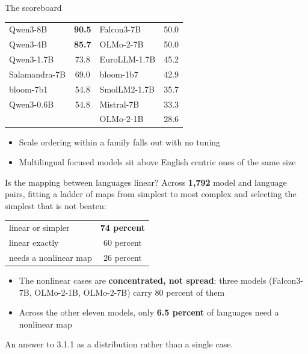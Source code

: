 \documentclass[aspectratio=169,11pt]{beamer}
\newcommand{\Hi}[1]{{\color{acc}\textbf{#1}}}
\begin{document}
\begin{frame}{The scoreboard}
\begin{center}\large
\begin{tabular}{lc@{\hspace{2cm}}lc}
\toprule
Qwen3-8B & \Hi{90.5} & Falcon3-7B & 50.0\\
Qwen3-4B & \Hi{85.7} & OLMo-2-7B & 50.0\\
Qwen3-1.7B & 73.8 & EuroLLM-1.7B & 45.2\\
Salamandra-7B & 69.0 & bloom-1b7 & 42.9\\
bloom-7b1 & 54.8 & SmolLM2-1.7B & 35.7\\
Qwen3-0.6B & 54.8 & Mistral-7B & 33.3\\
 & & OLMo-2-1B & 28.6\\
\bottomrule
\end{tabular}
\end{center}
\vspace{10pt}
\begin{itemize}
\item Scale ordering within a family falls out with no tuning
\item Multilingual focused models sit above English centric ones of the
same size
\end{itemize}
\end{frame}

\begin{frame}{Is the mapping between languages linear?}
Across \Hi{1{,}792} model and language pairs, fitting a ladder of maps
from simplest to most complex and selecting the simplest that is not
beaten:
\vspace{10pt}
\begin{center}\large
\begin{tabular}{lc}
\toprule
linear or simpler & \Hi{74 percent}\\
linear exactly & 60 percent\\
needs a nonlinear map & 26 percent\\
\bottomrule
\end{tabular}
\end{center}
\vspace{12pt}
\begin{itemize}\setlength\itemsep{5pt}
\item The nonlinear cases are \Hi{concentrated, not spread}: three
models (Falcon3-7B, OLMo-2-1B, OLMo-2-7B) carry 80 percent of them
\item Across the other eleven models, only \Hi{6.5 percent} of
languages need a nonlinear map
\end{itemize}
\vspace{6pt}
{\color{mut}An answer to 3.1.1 as a distribution rather than a single
case.}
\end{frame}
\end{document}
